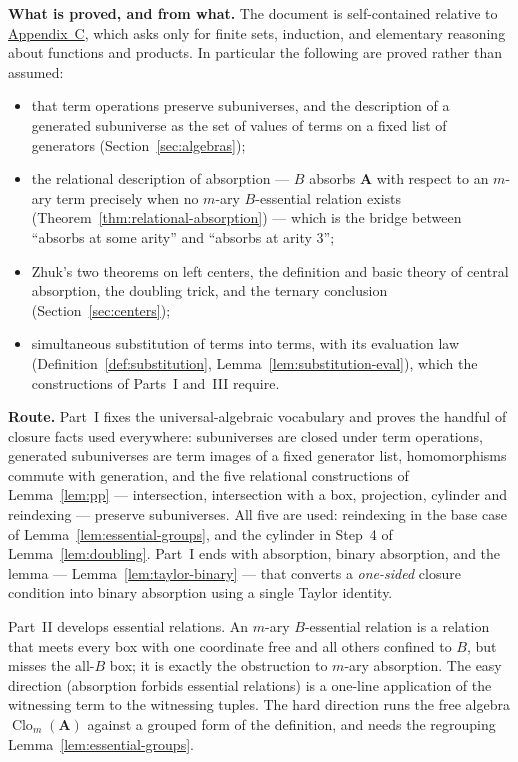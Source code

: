 \documentclass[11pt]{article}
\theoremstyle{mainplain}
\theoremstyle{mainroman}
\theoremstyle{definition}
\providecommand{\tightlist}{\setlength{\itemsep}{0pt}\setlength{\parskip}{0pt}}
\numberwithin{equation}{section}
\DeclareMathOperator{\Clo}{Clo}
\newcommand{\bA}{\mathbf A}
\begin{document}
\noindent\textbf{What is proved, and from what.} The document is
self-contained relative to \hyperref[app:background]{Appendix~C}, which asks
only for finite sets, induction, and elementary reasoning about functions and
products. In particular the following are proved rather than assumed:
\begin{itemize}\tightlist
\item that term operations preserve subuniverses, and the description of a
      generated subuniverse as the set of values of terms on a fixed list of
      generators (Section~\ref{sec:algebras});
\item the relational description of absorption --- $B$ absorbs $\bA$ with
      respect to an $m$-ary term precisely when no $m$-ary $B$-essential
      relation exists (Theorem~\ref{thm:relational-absorption}) --- which is the
      bridge between ``absorbs at some arity'' and ``absorbs at arity $3$'';
\item Zhuk's two theorems on left centers, the definition and basic theory of
      central absorption, the doubling trick, and the ternary conclusion
      (Section~\ref{sec:centers});
\item simultaneous substitution of terms into terms, with its evaluation law
      (Definition~\ref{def:substitution}, Lemma~\ref{lem:substitution-eval}),
      which the constructions of Parts~I and~III require.
\end{itemize}

\noindent\textbf{Route.} Part~I fixes the universal-algebraic vocabulary and
proves the handful of closure facts used everywhere: subuniverses are closed
under term operations, generated subuniverses are term images of a fixed
generator list, homomorphisms commute with generation, and the five relational
constructions of Lemma~\ref{lem:pp} --- intersection, intersection with a box,
projection, cylinder and reindexing --- preserve subuniverses. All five are
used: reindexing in the base case of Lemma~\ref{lem:essential-groups}, and the
cylinder in Step~4 of Lemma~\ref{lem:doubling}. Part~I ends with absorption,
binary absorption, and the lemma
--- Lemma~\ref{lem:taylor-binary} --- that converts a \emph{one-sided} closure
condition into binary absorption using a single Taylor identity.

Part~II develops essential relations. An $m$-ary $B$-essential relation is a
relation that meets every box with one coordinate free and all others confined
to $B$, but misses the all-$B$ box; it is exactly the obstruction to $m$-ary
absorption. The easy direction (absorption forbids essential relations) is a
one-line application of the witnessing term to the witnessing tuples. The hard
direction runs the free algebra $\Clo_m(\bA)$ against a grouped form of the
definition, and needs the regrouping Lemma~\ref{lem:essential-groups}.
\end{document}
